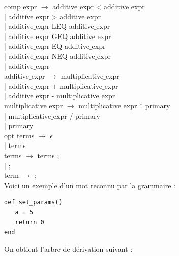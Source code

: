 \documentclass{article}
\begin{document}
\noindent comp$\_$expr $\rightarrow$ additive$\_$expr < additive$\_$expr \\
| additive$\_$expr > additive$\_$expr \\  
| additive$\_$expr LEQ additive$\_$expr \\  
| additive$\_$expr GEQ additive$\_$expr \\  
| additive$\_$expr EQ additive$\_$expr \\  
| additive$\_$expr NEQ additive$\_$expr \\  
| additive$\_$expr  \\

\noindent additive$\_$expr $\rightarrow$  multiplicative$\_$expr \\ 
| additive$\_$expr + multiplicative$\_$expr \\
| additive$\_$expr - multiplicative$\_$expr \\

\noindent multiplicative$\_$expr $\rightarrow$ multiplicative$\_$expr * primary \\
| multiplicative$\_$expr / primary \\
| primary \\

\noindent opt$\_$terms $\rightarrow$ $\epsilon$ \\
| terms		\\

\noindent terms $\rightarrow$ terms ; \\
| ; \\

\noindent term $\rightarrow$ ; \\

Voici un exemple d'un mot reconnu par la grammaire :
\begin{verbatim}
def set_params()
   a = 5
   return 0
end 
\end{verbatim}

On obtient l'arbre de dérivation suivant :
\end{document}
